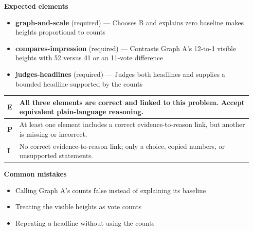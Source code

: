\documentclass[11pt]{article}
\begin{document}

\textbf{Expected elements}
\begin{itemize}[leftmargin=1.5em,itemsep=2pt,topsep=2pt]
  \item \textbf{graph-and-scale} (required) --- Chooses B and explains zero baseline makes heights proportional to counts
  \item \textbf{compares-impression} (required) --- Contrasts Graph A's 12-to-1 visible heights with 52 versus 41 or an 11-vote difference
  \item \textbf{judges-headlines} (required) --- Judges both headlines and supplies a bounded headline supported by the counts
\end{itemize}

{\small\renewcommand{\arraystretch}{1.25}
\noindent\begin{tabular}{|p{0.5in}|p{5.9in}|}
\hline
\textbf{E} & All three elements are correct and linked to this problem. Accept equivalent plain-language reasoning. \\ \hline
\textbf{P} & At least one element includes a correct evidence-to-reason link, but another is missing or incorrect. \\ \hline
\textbf{I} & No correct evidence-to-reason link; only a choice, copied numbers, or unsupported statements. \\ \hline
\end{tabular}}

\textbf{Common mistakes}
\begin{itemize}[leftmargin=1.5em,itemsep=2pt,topsep=2pt]
  \item Calling Graph A's counts false instead of explaining its baseline
  \item Treating the visible heights as vote counts
  \item Repeating a headline without using the counts
\end{itemize}

\clearpage
{}
\end{document}
